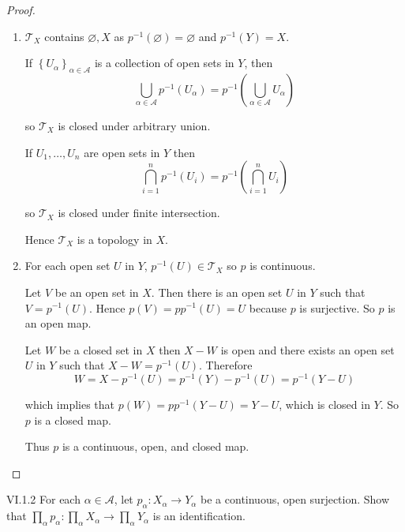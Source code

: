 \begin{proof}
	\begin{enumerate}[label={(\alph*)}]
		\item \( \mathscr{T}_{X} \) contains \( \varnothing, X \) as \( p^{-1}(\varnothing) = \varnothing \) and \( p^{-1}(Y) = X \).

		      If \( {\left\{ U_{\alpha} \right\}}_{\alpha\in\mathscr{A}} \) is a collection of open sets in \( Y \), then
		      \[
			      \bigcup_{\alpha\in\mathscr{A}} p^{-1}(U_{\alpha}) = p^{-1}\left(\bigcup_{\alpha\in\mathscr{A}} U_{\alpha}\right)
		      \]

		      so \( \mathscr{T}_{X} \) is closed under arbitrary union.

		      If \( U_{1}, \ldots, U_{n} \) are open sets in \( Y \) then
		      \[
			      \bigcap^{n}_{i=1} p^{-1}(U_{i}) = p^{-1}\left(\bigcap^{n}_{i=1} U_{i}\right)
		      \]

		      so \( \mathscr{T}_{X} \) is closed under finite intersection.

		      Hence \( \mathscr{T}_{X} \) is a topology in \( X \).
		\item For each open set \( U \) in \( Y \), \( p^{-1}(U) \in \mathscr{T}_{X} \) so \( p \) is continuous.

		      Let \( V \) be an open set in \( X \). Then there is an open set \( U \) in \( Y \) such that \( V = p^{-1}(U) \). Hence \( p(V) = pp^{-1}(U) = U \) because \( p \) is surjective. So \( p \) is an open map.

		      Let \( W \) be a closed set in \( X \) then \( X - W \) is open and there exists an open set \( U \) in \( Y \) such that \( X - W = p^{-1}(U) \). Therefore
		      \[
			      W = X - p^{-1}(U) = p^{-1}(Y) - p^{-1}(U) = p^{-1}(Y - U)
		      \]

		      which implies that \( p(W) = pp^{-1}(Y - U) = Y - U \), which is closed in \( Y \). So \( p \) is a closed map.

		      Thus \( p \) is a continuous, open, and closed map.
	\end{enumerate}
\end{proof}

\begin{problem}{VI.1.2}
For each \( \alpha \in \mathscr{A} \), let \( p_{\alpha}: X_{\alpha} \to Y_{\alpha} \) be a continuous, open surjection. Show that \( \prod_{\alpha} p_{\alpha}: \prod_{\alpha} X_{\alpha} \to \prod_{\alpha} Y_{\alpha} \) is an identification.
\end{problem}

